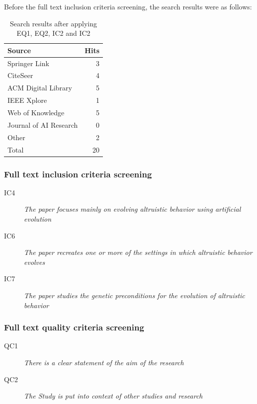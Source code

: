 \documentclass[a4paper]{book}
\begin{document}
				Before the full text inclusion criteria screening, the search results were as follows:
				\begin{table}[htdp]
				\begin{center}
				\begin{tabular}{|l|r|}
				\hline
				Source				& Hits 	\\ \hline
				Springer Link 			& 3 	\\ \hline
				CiteSeer    			& 4 \\ \hline
				ACM Digital Library 		& 5 \\ \hline
				IEEE Xplore 			& 1  \\ \hline
				Web of Knowledge 		& 5 \\ \hline
				Journal of AI Research 		& 0 	\\ \hline
				Other  				& 2 \\ \hline \hline
				Total				& 20 \\\hline\hline
				\end{tabular}
				\end{center}
				\label{table:SearchResults}
				\caption{Search results after applying EQ1, EQ2, IC2 and IC2}
				\end{table}
				\subsubsection{Full text inclusion criteria screening}

				\begin{description}
				\item[IC4] {\it The paper focuses mainly on evolving altruistic behavior using artificial evolution}
				\item[IC6] {\it The paper recreates one or more of the settings in which altruistic behavior evolves}
				\item[IC7] {\it The paper studies the genetic preconditions for the evolution of altruistic behavior}
				\end{description}

				\subsubsection{Full text quality criteria screening}

				\begin{description}
				\item[QC1] {\it There is a clear statement of the aim of the research} 
				\item[QC2] {\it The Study is put into context of other studies and research}
				\end{description}
\end{document}
